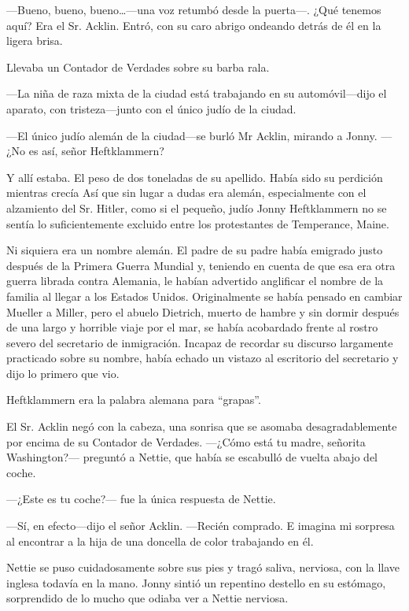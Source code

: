 ---Bueno, bueno, bueno\ldots{}---una voz retumbó desde la puerta---.
¿Qué tenemos aquí? Era el Sr. Acklin. Entró, con su caro abrigo ondeando
detrás de él en la ligera brisa.

Llevaba un Contador de Verdades sobre su barba rala.

---La niña de raza mixta de la ciudad está trabajando en su
automóvil---dijo el aparato, con tristeza---junto con el único judío de
la ciudad.

---El único judío alemán de la ciudad---se burló Mr Acklin, mirando a
Jonny. ---¿No es así, señor Heftklammern?

Y allí estaba. El peso de dos toneladas de su apellido. Había sido su
perdición mientras crecía Así que sin lugar a dudas era alemán,
especialmente con el alzamiento del Sr. Hitler, como si el pequeño,
judío Jonny Heftklammern no se sentía lo suficientemente excluido entre
los protestantes de Temperance, Maine.

Ni siquiera era un nombre alemán. El padre de su padre había emigrado
justo después de la Primera Guerra Mundial y, teniendo en cuenta de que
esa era otra guerra librada contra Alemania, le habían advertido
anglificar el nombre de la familia al llegar a los Estados Unidos.
Originalmente se había pensado en cambiar Mueller a Miller, pero el
abuelo Dietrich, muerto de hambre y sin dormir después de una largo y
horrible viaje por el mar, se había acobardado frente al rostro severo
del secretario de inmigración. Incapaz de recordar su discurso
largamente practicado sobre su nombre, había echado un vistazo al
escritorio del secretario y dijo lo primero que vio.

Heftklammern era la palabra alemana para ``grapas''.

El Sr. Acklin negó con la cabeza, una sonrisa que se asomaba
desagradablemente por encima de su Contador de Verdades. ---¿Cómo está
tu madre, señorita Washington?--- preguntó a Nettie, que había se
escabulló de vuelta abajo del coche.

---¿Este es tu coche?--- fue la única respuesta de Nettie.

---Sí, en efecto---dijo el señor Acklin. ---Recién comprado. E imagina
mi sorpresa al encontrar a la hija de una doncella de color trabajando
en él.

Nettie se puso cuidadosamente sobre sus pies y tragó saliva, nerviosa,
con la llave inglesa todavía en la mano. Jonny sintió un repentino
destello en su estómago, sorprendido de lo mucho que odiaba ver a Nettie
nerviosa.


